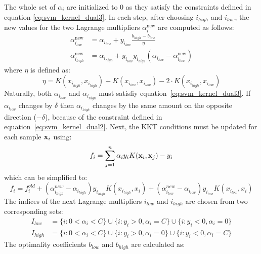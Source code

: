 \documentclass{llncs}
\begin{document}
The whole set of $\alpha_i$ are initialized to $0$ as they satisfy the constraints defined in equation \ref{eq:svm_kernel_dual3}. In each step, after choosing $i_{high}$ and $i_{low}$, the new values for the two Lagrange multipliers $\alpha_i^{\text{new}}$ are computed as follows:
\begin{align}
\alpha_{i_{low}}^\text{new} & = \alpha_{i_{low}} + y_{i_{low}} \frac{b_{high}-b_{low}}{\eta} \\
\alpha_{i_{high}}^\text{new} & = \alpha_{i_{high}} + y_{i_{low}}y_{i_{high}} (\alpha_{i_{low}}-\alpha_{i_{low}}^\text{new})
\end{align}
where $\eta$ is defined as:
\begin{equation}
\eta = K(x_{i_{high}},x_{i_{high}})+K(x_{i_{low}},x_{i_{low}})-2\cdot K(x_{i_{high}},x_{i_{low}})
\end{equation}
Naturally, both $\alpha_{i_{low}}$ and $\alpha_{i_{high}}$ must satisfiy equation~\ref{eq:svm_kernel_dual3}. If $\alpha_{i_{low}}$ changes by $\delta$ then $\alpha_{i_{high}}$ changes by the same amount on the opposite direction ($- \delta$), because of the constraint defined in equation~\ref{eq:svm_kernel_dual2}. Next, the \ac{KKT} conditions must be updated for each sample ${\mathbf x}_i$ using:
\begin{equation}
f_i= \sum\limits_{j=1}^{n}\alpha_i y_i K({\mathbf x}_i,{\mathbf x}_j)-y_i
\end{equation}
which can be simplified to:
\begin{equation}
f_i=f_i^{old}+(\alpha_{i_{high}}^{new}-\alpha_{i_{high}})y_{i_{high}}K(x_{i_{high}},x_i) + (\alpha_{i_{low}}^{new}-\alpha_{i_{low}})y_{i_{low}}K(x_{i_{low}},x_i)
\end{equation}
The indices of the next Lagrange multipliers $ i_{low} $ and $ i_{high} $ are chosen from two corresponding sets:
\begin{align}
I_{low} &= \{i:0<\alpha_i<C\} \cup \{i:y_i>0 , \alpha_i=C\} \cup \{i:y_i<0 , \alpha_i=0\} \\
I_{high} &= \{i:0<\alpha_i<C\} \cup \{i:y_i>0 , \alpha_i=0\} \cup \{i:y_i<0 , \alpha_i=C\}
\end{align}
The optimality coefficients $b_{low}$ and $b_{high}$ are calculated as:
\end{document}
